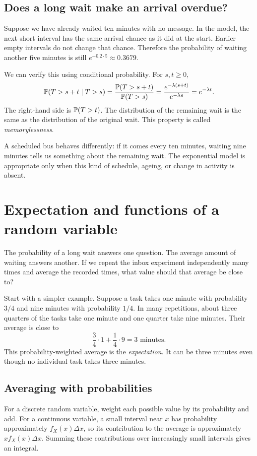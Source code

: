 \subsection{Does a long wait make an arrival overdue?}

Suppose we have already waited ten minutes with no message. In the model,
the next short interval has the same arrival chance as it did at the
start. Earlier empty intervals do not change that chance. Therefore the
probability of waiting another five minutes is still
\(e^{-0.2\cdot5}\approx0.3679\).

We can verify this using conditional probability. For \(s,t\ge0\),
\[
  \mathbb{P}(T>s+t\mid T>s)
  =\frac{\mathbb{P}(T>s+t)}{\mathbb{P}(T>s)}
  =\frac{e^{-\lambda(s+t)}}{e^{-\lambda s}}
  =e^{-\lambda t}.
\]
The right-hand side is \(\mathbb{P}(T>t)\). The distribution of the remaining
wait is the same as the distribution of the original wait. This property
is called \emph{memorylessness}.

A scheduled bus behaves differently: if it comes every ten minutes,
waiting nine minutes tells us something about the remaining wait.
The exponential model is appropriate only when this kind of schedule,
ageing, or change in activity is absent.

\section{Expectation and functions of a random variable}
\label{sec:expectation}

The probability of a long wait answers one question. The average amount
of waiting answers another. If we repeat the inbox experiment independently
many times and average the recorded times, what value should that average
be close to?

Start with a simpler example. Suppose a task takes one minute with
probability \(3/4\) and nine minutes with probability \(1/4\).
In many repetitions, about three quarters of the tasks take one minute
and one quarter take nine minutes. Their average is close to
\[
  \frac34\cdot1+\frac14\cdot9=3\text{ minutes}.
\]
This probability-weighted average is the \emph{expectation}. It can be
three minutes even though no individual task takes three minutes.

\subsection{Averaging with probabilities}

For a discrete random variable, weight each possible value by its
probability and add. For a continuous variable, a small interval near
\(x\) has probability approximately \(f_X(x)\Delta x\), so its contribution
to the average is approximately \(x f_X(x)\Delta x\).
Summing these contributions over increasingly small intervals gives an
integral.

